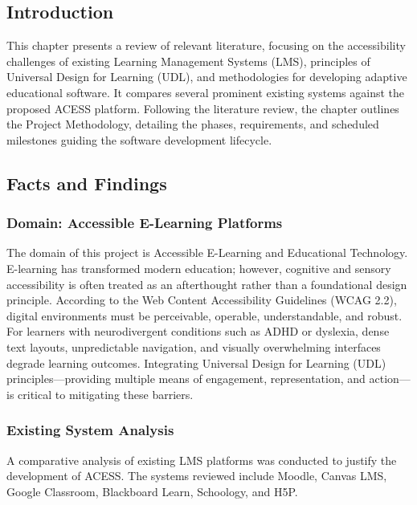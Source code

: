 \documentclass[12pt,a4paper]{report}
\begin{document}
\subsection{Introduction}
This chapter presents a review of relevant literature, focusing on the accessibility challenges of existing Learning Management Systems (LMS), principles of Universal Design for Learning (UDL), and methodologies for developing adaptive educational software. It compares several prominent existing systems against the proposed ACESS platform. Following the literature review, the chapter outlines the Project Methodology, detailing the phases, requirements, and scheduled milestones guiding the software development lifecycle.

\subsection{Facts and Findings}

\subsubsection{Domain: Accessible E-Learning Platforms}
The domain of this project is Accessible E-Learning and Educational Technology. E-learning has transformed modern education; however, cognitive and sensory accessibility is often treated as an afterthought rather than a foundational design principle. According to the Web Content Accessibility Guidelines (WCAG 2.2), digital environments must be perceivable, operable, understandable, and robust. For learners with neurodivergent conditions such as ADHD or dyslexia, dense text layouts, unpredictable navigation, and visually overwhelming interfaces degrade learning outcomes. Integrating Universal Design for Learning (UDL) principles—providing multiple means of engagement, representation, and action—is critical to mitigating these barriers.

\subsubsection{Existing System Analysis}
A comparative analysis of existing LMS platforms was conducted to justify the development of ACESS. The systems reviewed include Moodle, Canvas LMS, Google Classroom, Blackboard Learn, Schoology, and H5P.
\end{document}
